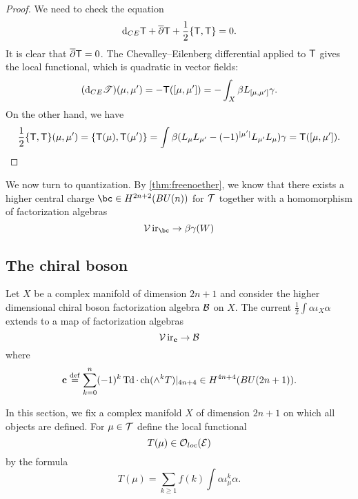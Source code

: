 \documentclass[11pt]{amsart}
\newcommand{\fields}{\cE}
\renewcommand{\op}{\operatorname}
\begin{document}
\begin{proof}
We need to check the equation
\begin{equation}\label{eqn:mcbg}
  {\rm d}_{CE} \mathsf T + \overline{\partial} \mathsf T + \frac12 \{\mathsf T, \mathsf T\} = 0 .
\end{equation}
It is clear that $\overline{\partial} \mathsf T = 0$.
The Chevalley--Eilenberg differential applied to $\mathsf T$ gives the local functional, which is quadratic in vector fields: 
\begin{equation}\label{}
  ({\rm d}_{CE} \mathscr T)(\mu,\mu') = -\mathsf T([\mu,\mu'])= - \int_X \beta L_{[\mu,\mu']} \gamma . 
\end{equation}
On the other hand, we have 
\begin{equation}\label{}
  \frac12 \{\mathsf T,\mathsf T\} (\mu,\mu') = \{\mathsf T(\mu),\mathsf T(\mu')\} = \int \beta (L_\mu L_{\mu'} - (-1)^{|\mu'|} L_{\mu'} L_\mu)
\gamma = \mathsf T([\mu,\mu']).
\end{equation}
\end{proof}

We now turn to quantization.
By \ref{thm:freenoether}, we know that there exists a higher central charge $\bc \in H^{2n+2}(BU(n))$ for $\mathcal T$ together with a homomorphism of
factorization algebras 
\begin{equation}\label{}
  \cV\op{ir}_{\bc} \to \beta\gamma(W)   
\end{equation}

\subsection{The chiral boson}


\begin{thm}
Let $X$ be a complex manifold of dimension $2n+1$ and consider the higher dimensional chiral boson factorization algebra $\mathcal B$ on $X$.
The current $\frac12 \int \alpha \iota_X \alpha$ extends to a map of factorization algebras
\begin{equation}
\cV\op{ir}_{\mathbf{c}} \to \cB 
\end{equation}
where
\begin{equation}
\mathbf{c} \define \sum^{n}_{k = 0} (-1)^k \op{Td} \cdot \op{ch}(\wedge^k T)|_{4n+4} \in H^{4n+4}(BU(2n+1)) .
\end{equation}
\end{thm}
In this section, we fix a complex manifold $X$ of dimension $2n+1$ on which all objects are defined.
For $\mu \in \mathcal T$ define the local functional
\begin{equation}
T(\mu) \in \oloc(\fields)
\end{equation}
by the formula
\begin{equation}
T(\mu) = \sum_{k \geq 1} f(k) \int \alpha \iota_\mu^k \alpha .
\end{equation}
\end{document}
